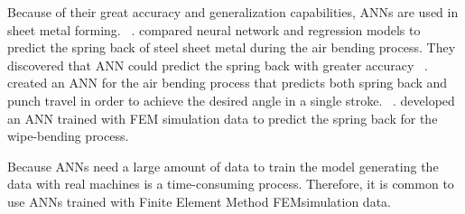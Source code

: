 Because of their great accuracy and generalization capabilities, \ac{ANN}s are used in sheet metal forming.
~\cite[p. 2]{cruz2021application}.
\cite{narayanasamy2012comparison} compared neural network and regression models to predict the
spring back of steel sheet metal during the air bending process.
They discovered that ANN could predict the spring back with greater accuracy
~\cite[]{narayanasamy2012comparison}.
\cite{inamdar2000development} created an ANN for the air bending process that
predicts both spring back and punch travel in
order to
achieve the desired angle in a single stroke.
~\cite{inamdar2000development}.
\cite{kazan2009prediction} developed an ANN trained with FEM simulation data to predict the
spring back for the wipe-bending process.

Because \ac{ANN}s need a large amount of data to train the model generating the data
with real machines is a time-consuming process.
Therefore, it is common to use \ac{ANN}s trained with Finite Element Method \ac{FEM}simulation data.